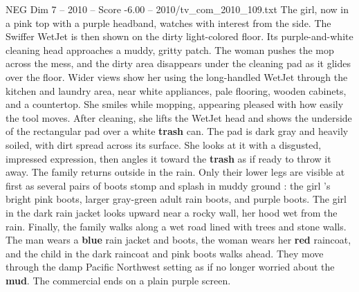 \begin{textsample}{NEG Dim 7 – 2010 – Score -6.00 – 2010/tv\_com\_2010\_109.txt}
The girl, now in a pink top with a purple headband, watches with interest from the side.
The Swiffer WetJet is then shown on the dirty light-colored floor.
Its purple-and-white cleaning head approaches a muddy, gritty patch.
The woman pushes the mop across the mess, and the dirty area disappears under the cleaning pad as it glides over the floor.
Wider views show her using the long-handled WetJet through the kitchen and laundry area, near white appliances, pale flooring, wooden cabinets, and a countertop.
She smiles while mopping, appearing pleased with how easily the tool moves.
After cleaning, she lifts the WetJet head and shows the underside of the rectangular pad over a white \textbf{trash} can.
The pad is dark gray and heavily soiled, with dirt spread across its surface.
She looks at it with a disgusted, impressed expression, then angles it toward the \textbf{trash} as if ready to throw it away.
The family returns outside in the rain.
Only their lower legs are visible at first as several pairs of boots stomp and splash in muddy ground : the girl ’s bright pink boots, larger gray-green adult rain boots, and purple boots.
The girl in the dark rain jacket looks upward near a rocky wall, her hood wet from the rain.
Finally, the family walks along a wet road lined with trees and stone walls.
The man wears a \textbf{blue} rain jacket and boots, the woman wears her \textbf{red} raincoat, and the child in the dark raincoat and pink boots walks ahead.
They move through the damp Pacific Northwest setting as if no longer worried about the \textbf{mud}.
The commercial ends on a plain purple screen.

\end{textsample}
